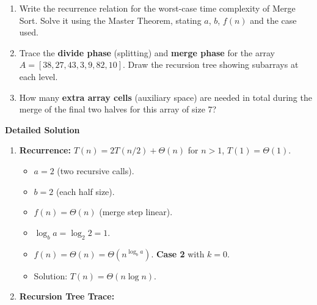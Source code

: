 \documentclass[11pt]{article}
\begin{document}
\begin{exoresolu}
    \begin{enumerate}
        \item Write the recurrence relation for the worst-case time complexity of Merge Sort. Solve it using the Master Theorem, stating $a$, $b$, $f(n)$ and the case used.
        \item Trace the \textbf{divide phase} (splitting) and \textbf{merge phase} for the array $A = [38, 27, 43, 3, 9, 82, 10]$. Draw the recursion tree showing subarrays at each level.
        \item How many \textbf{extra array cells} (auxiliary space) are needed in total during the merge of the final two halves for this array of size 7?
    \end{enumerate}
    \tcblower
    \textbf{Detailed Solution}
    \begin{enumerate}
        \item \textbf{Recurrence:} $T(n) = 2T(n/2) + \Theta(n)$ for $n>1$, $T(1)=\Theta(1)$.
            \begin{itemize}
                \item $a = 2$ (two recursive calls).
                \item $b = 2$ (each half size).
                \item $f(n) = \Theta(n)$ (merge step linear).
                \item $\log_b a = \log_2 2 = 1$.
                \item $f(n) = \Theta(n) = \Theta(n^{\log_b a})$. \textbf{Case 2} with $k=0$.
                \item Solution: $T(n) = \Theta(n \log n)$.
            \end{itemize}
        \item \textbf{Recursion Tree Trace:}
            \begin{center}
\end{center}
\end{enumerate}
\end{exoresolu}
\end{document}
